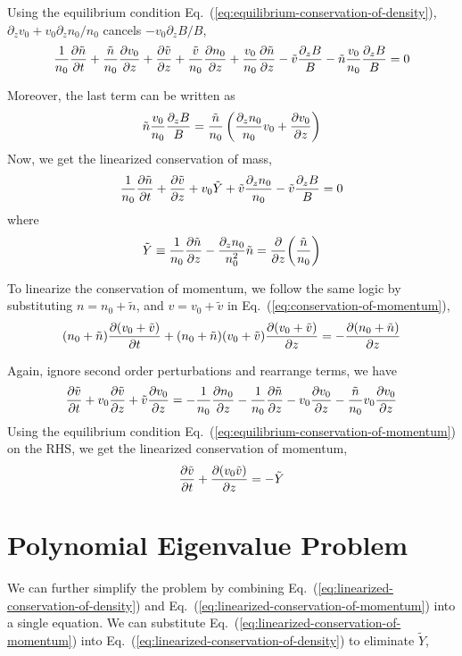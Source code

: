 Using the equilibrium condition Eq.~(\ref{eq:equilibrium-conservation-of-density}), $\partial_zv_0+v_0\partial_zn_0/n_0$ cancels $-v_0\partial_zB/B$,
\[ \frac{1}{n_0}\pdv{\tilde{n}}{t}
	+ \frac{\tilde{n}}{n_0}\pdv{v_0}{z} + \pdv{\tilde{v}}{z}
	+ \frac{\tilde{v}}{n_0}\pdv{n_0}{z} + \frac{v_0}{n_0}\pdv{\tilde{n}}{z}
	- \tilde{v}\frac{\partial_z B}{B} - \tilde{n}\frac{v_0}{n_0}\frac{\partial_z B}{B} = 0
\]

Moreover, the last term can be written as
\[ \tilde{n}\frac{v_0}{n_0}\frac{\partial_z B}{B} = \frac{\tilde{n}}{n_0}\left( \frac{\partial_z n_0}{n_0}v_0 + \pdv{v_0}{z} \right) \]
Now, we get the linearized conservation of mass,
\begin{equation} \label{eq:linearized-conservation-of-density}
	\frac{1}{n_0}\pdv{\tilde{n}}{t}
	+ \pdv{\tilde{v}}{z} + v_0\tilde{Y} + \tilde{v}\frac{\partial_z n_0}{n_0} - \tilde{v}\frac{\partial_z B}{B} = 0
\end{equation}
where
\[ \tilde{Y} \equiv \frac{1}{n_0}\pdv{\tilde{n}}{z} - \frac{\partial_z n_0}{n_0^2}\tilde{n} = \pdv{z}(\frac{\tilde{n}}{n_0}) \]

To linearize the conservation of momentum, we follow the same logic by substituting $n=n_0+\tilde{n}$, and $v=v_0+\tilde{v}$ in Eq.~(\ref{eq:conservation-of-momentum}),
\[ (n_0+\tilde{n})\pdv{(v_0+\tilde{v})}{t} + (n_0+\tilde{n})(v_0+\tilde{v})\pdv{(v_0+\tilde{v})}{z} = -\pdv{(n_0+\tilde{n})}{z} \]

Again, ignore second order perturbations and rearrange terms, we have
\[ \pdv{\tilde{v}}{t} + v_0\pdv{\tilde{v}}{z} + \tilde{v}\pdv{v_0}{z}
	= -\frac{1}{n_0}\pdv{n_0}{z} -\frac{1}{n_0}\pdv{\tilde{n}}{z} -v_0\pdv{v_0}{z} - \frac{\tilde{n}}{n_0}v_0\pdv{v_0}{z} \]
Using the equilibrium condition Eq.~(\ref{eq:equilibrium-conservation-of-momentum}) on the RHS, we get the linearized conservation of momentum,
\begin{equation} \label{eq:linearized-conservation-of-momentum}
	\pdv{\tilde{v}}{t} + \pdv{(v_0\tilde{v})}{z} = -\tilde{Y}
\end{equation}

\section{Polynomial Eigenvalue Problem}
We can further simplify the problem by combining Eq.~(\ref{eq:linearized-conservation-of-density}) and Eq.~(\ref{eq:linearized-conservation-of-momentum}) into a single equation. We can substitute Eq.~(\ref{eq:linearized-conservation-of-momentum}) into Eq.~(\ref{eq:linearized-conservation-of-density}) to eliminate $\tilde{Y}$,

